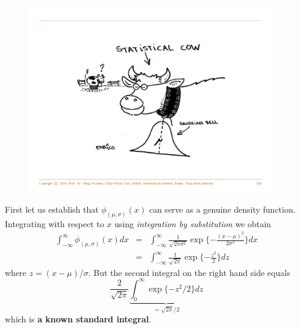 \documentclass[notes=show,smaller,handout]{beamer}\usepackage[]{graphicx}\usepackage[]{color}
\begin{document}
\begin{frame}{\subsecname}
  \begin{figure}[ptb]\centering
  \includegraphics[width=0.95\textwidth,height=0.75\textheight]{img/Cow.pdf}%
  \end{figure}
\end{frame}

\begin{frame}{\subsecname}

  First let us establish that $\phi_{(\mu,\sigma)}(x)$ can serve as a
  genuine density function. Integrating with respect to $x$ using
  \textit{integration by substitution} we obtain
  \begin{eqnarray*}
  \int_{-\infty}^{\infty}\phi_{(\mu,\sigma)}(x)dx&=&
  \int_{-\infty}^{\infty}\frac{1}{\sqrt{2\pi\sigma^2}}\exp{\{-\frac{(x-\mu)^2}{2\sigma^2}\}}dx
  \\
   &=&\int_{-\infty}^{\infty}\frac{1}{\sqrt{2\pi}}\exp{\{-\frac{z^2}{2}\}}dz
  \end{eqnarray*}
  where $z=(x-\mu)/\sigma$. But the second integral on the right
  hand side equals
  $$
  \frac{2}{\sqrt{2\pi}}\underbrace{\int_0^{\infty}\exp{\{-z^2/2\}}dz}_{={\sqrt{2\pi}} \big/ {2}}
  $$
  which is \textbf{a known standard integral}.
\end{frame}
\end{document}

